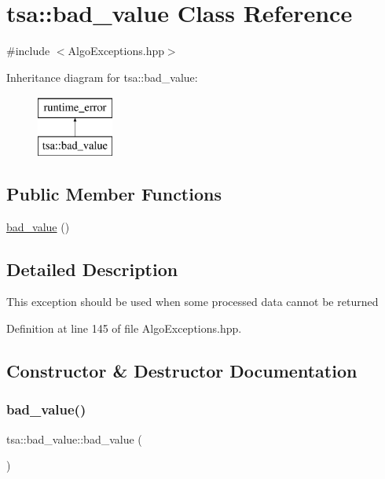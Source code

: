 \hypertarget{classtsa_1_1bad__value}{}\section{tsa\+:\+:bad\+\_\+value Class Reference}
\label{classtsa_1_1bad__value}


{\ttfamily \#include $<$Algo\+Exceptions.\+hpp$>$}

Inheritance diagram for tsa\+:\+:bad\+\_\+value\+:\begin{figure}[H]
\begin{center}
\leavevmode
\includegraphics[height=2.000000cm]{classtsa_1_1bad__value}
\end{center}
\end{figure}
\subsection*{Public Member Functions}
\begin{DoxyCompactItemize}
\item 
\hyperlink{classtsa_1_1bad__value_a23b7068f35f29697bb817109e378bd8e}{bad\+\_\+value} ()
\end{DoxyCompactItemize}


\subsection{Detailed Description}
This exception should be used when some processed data cannot be returned 

Definition at line 145 of file Algo\+Exceptions.\+hpp.



\subsection{Constructor \& Destructor Documentation}
\mbox{\label{classtsa_1_1bad__value_a23b7068f35f29697bb817109e378bd8e}} 
\subsubsection{\texorpdfstring{bad\+\_\+value()}{bad\_value()}}
{\footnotesize\ttfamily tsa\+::bad\+\_\+value\+::bad\+\_\+value (\begin{DoxyParamCaption}{ }\end{DoxyParamCaption})\hspace{0.3cm}{\ttfamily [inline]}}

